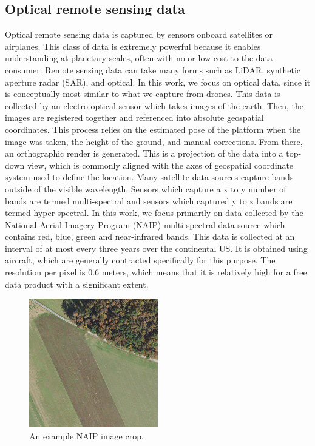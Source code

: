 \subsection{Optical remote sensing data}
Optical remote sensing data is captured by sensors onboard satellites or airplanes. This class of data is extremely powerful because it enables understanding at planetary scales, often with no or low cost to the data consumer. Remote sensing data can take many forms such as LiDAR, synthetic aperture radar (SAR), and optical. In this work, we focus on optical data, since it is conceptually most similar to what we capture from drones. This data is collected by an electro-optical sensor which takes images of the earth. Then, the images are registered together and referenced into absolute geospatial coordinates. This process relies on the estimated pose of the platform when the image was taken, the height of the ground, and manual corrections. From there, an orthographic render is generated. This is a projection of the data into a top-down view, which is commonly aligned with the axes of geospatial coordinate system used to define the location. Many satellite data sources capture bands outside of the visible wavelength. Sensors which capture a x to y number of bands are termed multi-spectral and sensors which captured y to z bands are termed hyper-spectral. In this work, we focus primarily on data collected by the National Aerial Imagery Program (NAIP) multi-spectral data source which contains red, blue, green and near-infrared bands. This data is collected at an interval of at most every three years over the continental US. It is obtained using aircraft, which are generally contracted specifically for this purpose. The resolution per pixel is 0.6 meters, which means that it is relatively high for a free data product with a significant extent.

\begin{figure}
    \centering
    \includegraphics[width=0.5\textwidth]{figs/methods/datasets/NAIP_example.png}
    \caption{An example NAIP image crop.}
    \label{fig:methods:NAIP_example}
\end{figure}






